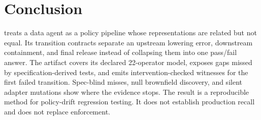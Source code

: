 \section{Conclusion}

\policystrata{} treats a data agent as a policy pipeline whose representations are related but not equal. Its transition contracts separate an upstream lowering error, downstream containment, and final release instead of collapsing them into one pass/fail answer. The artifact covers its declared 22-operator model, exposes gaps missed by specification-derived tests, and emits intervention-checked witnesses for the first failed transition. Spec-blind misses, null brownfield discovery, and silent adapter mutations show where the evidence stops. The result is a reproducible method for policy-drift regression testing. It does not establish production recall and does not replace enforcement.
